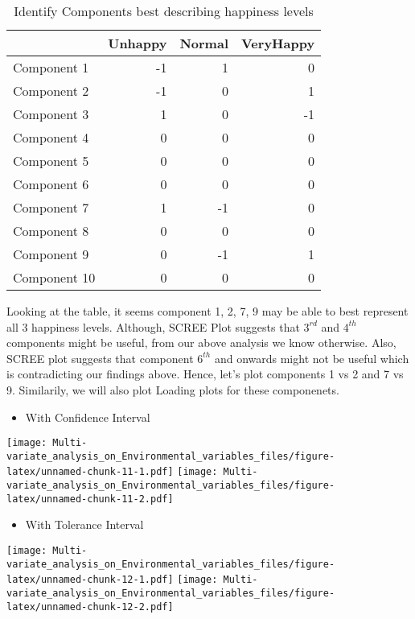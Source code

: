 \documentclass[]{book}
\providecommand{\tightlist}{%
  \setlength{\itemsep}{0pt}\setlength{\parskip}{0pt}}
\begin{document}
\begin{table}

\caption{\label{tab:unnamed-chunk-10}Identify Components best describing happiness levels}
\centering
\begin{tabular}[t]{lrrr}
\toprule
  & Unhappy & Normal & VeryHappy\\
\midrule
Component 1 & -1 & 1 & 0\\
Component 2 & -1 & 0 & 1\\
Component 3 & 1 & 0 & -1\\
Component 4 & 0 & 0 & 0\\
Component 5 & 0 & 0 & 0\\
\addlinespace
Component 6 & 0 & 0 & 0\\
Component 7 & 1 & -1 & 0\\
Component 8 & 0 & 0 & 0\\
Component 9 & 0 & -1 & 1\\
Component 10 & 0 & 0 & 0\\
\bottomrule
\end{tabular}
\end{table}

Looking at the table, it seems component 1, 2, 7, 9 may be able to best
represent all 3 happiness levels. Although, SCREE Plot suggests that
\(3^{rd}\) and \(4^{th}\) components might be useful, from our above
analysis we know otherwise. Also, SCREE plot suggests that component
\(6^{th}\) and onwards might not be useful which is contradicting our
findings above. Hence, let's plot components 1 vs 2 and 7 vs 9.
Similarily, we will also plot Loading plots for these componenets.

\begin{itemize}
\tightlist
\item
  With Confidence Interval
\end{itemize}

\texttt{[image: Multi-variate\_analysis\_on\_Environmental\_variables\_files/figure-latex/unnamed-chunk-11-1.pdf]}
\texttt{[image: Multi-variate\_analysis\_on\_Environmental\_variables\_files/figure-latex/unnamed-chunk-11-2.pdf]}

\begin{itemize}
\tightlist
\item
  With Tolerance Interval
\end{itemize}

\texttt{[image: Multi-variate\_analysis\_on\_Environmental\_variables\_files/figure-latex/unnamed-chunk-12-1.pdf]}
\texttt{[image: Multi-variate\_analysis\_on\_Environmental\_variables\_files/figure-latex/unnamed-chunk-12-2.pdf]}
\end{document}
